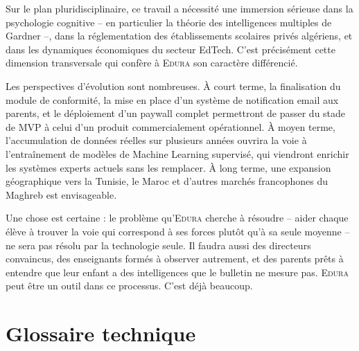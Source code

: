 \documentclass[12pt,a4paper,oneside]{report}
\newcommand{\edura}{\textsc{Edura}}
\begin{document}
\vspace{6pt}
Sur le plan pluridisciplinaire, ce travail a nécessité une immersion sérieuse dans la psychologie cognitive -- en particulier la théorie des intelligences multiples de Gardner \autocite{gardner1983frames} --, dans la réglementation des établissements scolaires privés algériens, et dans les dynamiques économiques du secteur EdTech. C'est précisément cette dimension transversale qui confère à \edura{} son caractère différencié.

\vspace{6pt}
Les perspectives d'évolution sont nombreuses. À court terme, la finalisation du module de conformité, la mise en place d'un système de notification email aux parents, et le déploiement d'un paywall complet permettront de passer du stade de MVP à celui d'un produit commercialement opérationnel. À moyen terme, l'accumulation de données réelles sur plusieurs années ouvrira la voie à l'entraînement de modèles de Machine Learning supervisé, qui viendront enrichir les systèmes experts actuels sans les remplacer. À long terme, une expansion géographique vers la Tunisie, le Maroc et d'autres marchés francophones du Maghreb est envisageable.

\vspace{6pt}
Une chose est certaine : le problème qu'\edura{} cherche à résoudre -- aider chaque élève à trouver la voie qui correspond à ses forces plutôt qu'à sa seule moyenne -- ne sera pas résolu par la technologie seule. Il faudra aussi des directeurs convaincus, des enseignants formés à observer autrement, et des parents prêts à entendre que leur enfant a des intelligences que le bulletin ne mesure pas. \edura{} peut être un outil dans ce processus. C'est déjà beaucoup.

\printbibliography[heading=bibintoc, title={Bibliographie}]

\appendix

\chapter{Glossaire technique}
\end{document}
